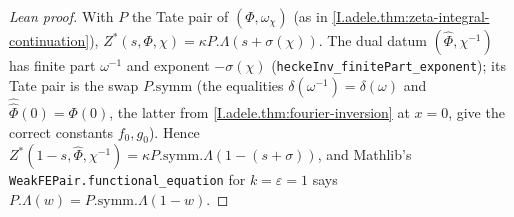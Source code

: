 \begin{proof}[Lean proof]
With $P$ the Tate pair of $(\Phi,\omega_\chi)$ (as in \cref{I.adele.thm:zeta-integral-continuation}), $Z^*(s,\Phi,\chi)=\kappa P.\Lambda(s+\sigma(\chi))$. The dual datum $(\hat\Phi,\chi^{-1})$ has finite part $\omega^{-1}$ and exponent $-\sigma(\chi)$ (\texttt{heckeInv\_finitePart\_exponent}); its Tate pair is the swap $P.\mathrm{symm}$ (the equalities $\delta(\omega^{-1})=\delta(\omega)$ and $\hat{\hat\Phi}(0)=\Phi(0)$, the latter from \cref{I.adele.thm:fourier-inversion} at $x=0$, give the correct constants $f_0,g_0$). Hence $Z^*(1-s,\hat\Phi,\chi^{-1})=\kappa P.\mathrm{symm}.\Lambda(1-(s+\sigma))$, and Mathlib's \texttt{WeakFEPair.functional\_equation} for $k=\varepsilon=1$ says $P.\Lambda(w)=P.\mathrm{symm}.\Lambda(1-w)$.
\end{proof}

